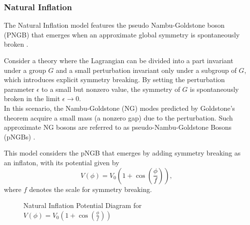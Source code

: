 \documentclass[12pt]{article}
\newcommand{\tcb}[2]{\begin{tcolorbox}[title={\textcolor{white}{#1}}, opacitybacktitle = 0, colframe=white!40!black]#2
\end{tcolorbox}}
\numberwithin{equation}{section}
\begin{document}
\subsubsection*{Natural Inflation}
The Natural Inflation model features the pseudo Nambu-Goldstone boson (PNGB) that emerges when an approximate global symmetry is spontaneously broken \cite{Adams:1992bn}.
\tcb{pseudo-Nambu-Goldston boson (pNGB)}{
    Consider a theory where the Lagrangian can be divided into a part invariant under a group $G$ and a small perturbation invariant only under a subgroup of $G$, which introduces explicit symmetry breaking. By setting the perturbation parameter $\epsilon$ to a small but nonzero value, the symmetry of $G$ is spontaneously broken in the limit $\epsilon \to 0$.\\
    In this scenario, the Nambu-Goldstone (NG) modes predicted by Goldstone's theorem acquire a small mass (a nonzero gap) due to the perturbation. Such approximate NG bosons are referred to as pseudo-Nambu-Goldstone Bosons (pNGBs) \cite{Brauner:2024juy}.
}
\noindent This model considers the pNGB that emerges by adding symmetry breaking as an inflaton, with its potential given by
\begin{equation}
    V(\phi) = V_0 \left( 1 + \cos\left( \frac{\phi}{f} \right) \right),
\end{equation}
where $f$ denotes the scale for symmetry breaking.
\begin{figure}[H]
    \centering
    \caption{Natural Inflation Potential Diagram for $\displaystyle V(\phi) = V_0 \left( 1 + \cos\left( \frac{\phi}{f} \right) \right)$}
\end{figure}
\end{document}
